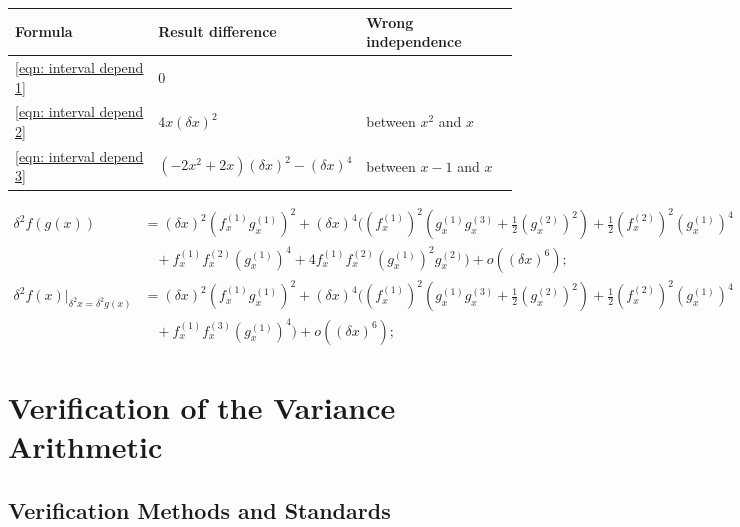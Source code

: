 \documentclass[twoside]{article}
\numberwithin{equation}{section}
\newcommand{\eqspace}{\;\;\;}
\begin{document}
\begin{table}
\centering
\begin{tabular}{|l|l|l|} 
\hline 
Formula & Result difference & Wrong independence \\ 
\hline 
\eqref{eqn: interval depend 1} & $0$ & \\
\hline 
\eqref{eqn: interval depend 2} & $4 x (\delta x)^2$ & between $x^2$ and $x$ \\
\hline 
\eqref{eqn: interval depend 3} & $( - 2 x^2 + 2 x) (\delta x)^2 - (\delta x)^4$ & between $x-1$ and $x$ \\
\hline 
\end{tabular}
\label{tbl: dependency example}
\end{table}

\begin{align}
\label{eqn: composite variance 1d}
\delta^2 f(g(x)) &= (\delta x)^2 (f^{(1)}_x g^{(1)}_x)^2 + (\delta x)^4
    ((f^{(1)}_x)^2 (g^{(1)}_x g^{(3)}_x + \frac{1}{2}(g^{(2)}_x)^2) + \frac{1}{2} (f^{(2)}_x)^2 (g^{(1)}_x)^4 \nonumber \\
  &\eqspace + f^{(1)}_x f^{(2)}_x (g^{(1)}_x)^4 + 4 f^{(1)}_x f^{(2)}_x (g^{(1)}_x)^2 g^{(2)}_x) + o((\delta x)^6); \\
\label{eqn: progressive variance}
\delta^2 f(x)|_{\delta^2 x = \delta^2 g(x)} &= (\delta x)^2 (f^{(1)}_x g^{(1)}_x)^2 + (\delta x)^4 
    ((f^{(1)}_x)^2 (g^{(1)}_x g^{(3)}_x + \frac{1}{2}(g^{(2)}_x)^2) + \frac{1}{2} (f^{(2)}_x)^2 (g^{(1)}_x)^4 \nonumber \\
  &\eqspace + f^{(1)}_x f^{(3)}_x (g^{(1)}_x)^4) + o((\delta x)^6) ; 
\end{align}



\clearpage
\section{Verification of the Variance Arithmetic}
\label{sec: validation}

\subsection{Verification Methods and Standards}
\end{document}
